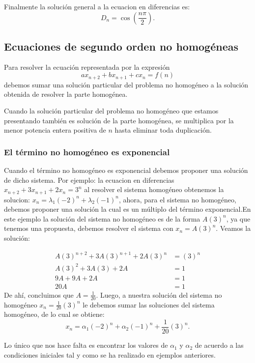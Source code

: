 \documentclass{article}
\begin{document}
Finalmente la solución general a la ecuacion en diferencias es:
\begin{equation}
  \label{solucion determinante}
D_{n}=\cos(\frac{n\pi}{2}).
\end{equation}


\subsection{Ecuaciones de segundo orden no homogéneas}
\label{sec:nohomogeneas}

Para resolver la ecuación representada por la expresión
$$ax_{n+2}+bx_{n+1}+cx_{n}=f(n)$$ debemos sumar una solución particular
del problema no homogéneo a la solución obtenida de resolver la parte
homogénea.

Cuando la solución particular del problema no homogéneo que estamos
presentando también es solución de la parte homogénea, se multiplica
por la menor potencia entera positiva de $n$ hasta eliminar toda
duplicación.

\subsubsection{El término no homogéneo es exponencial}
\label{sec:exponencial}

Cuando el término no homogéneo es exponencial debemos proponer una
solución de dicho sistema. Por ejemplo: la ecuacion en diferencias
$x_{n+2}+3x_{n+1}+2x_n=3^n$ al resolver el sistema homogéneo
obtenemos la solucion: $x_n=\lambda_1(-2)^n+\lambda_2(-1)^n$, ahora,
para el sistema no homogéneo, debemos proponer una solución la
cual es un múltiplo del término exponencial.En este ejemplo la
solución del sistema no homogéneo es de la forma $A(3)^n$, ya que
tenemos una propuesta, debemos resolver el sistema con $x_n=A(3)^n$.
Veamos la solución:

\begin{align*}
  A(3)^{n+2}+3A(3)^{n+1}+2A(3)^n&=(3)^n\\
  A(3)^2+3A(3)+2A&=1\\
  9A+9A+2A&=1\\
  20A&=1
\end{align*}
De ahí, concluimos que $A=\frac{1}{20}$.
Luego, a nuestra solución del sistema no homogéneo  $x_n=\frac{1}{20}(3)^n$ le debemos sumar las soluciones del sistema homogéneo, de lo cual se obtiene:
$$x_n=\alpha_1(-2)^n+\alpha_2(-1)^n+\frac{1}{20}(3)^n.$$

Lo único que nos hace falta es encontrar los valores de $\alpha_1$ y $\alpha_2$ de acuerdo a las condiciones iniciales tal y como se ha realizado en ejemplos anteriores.
\end{document}
